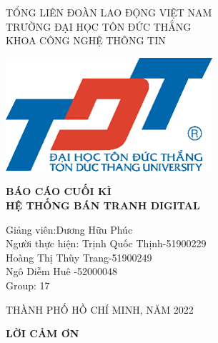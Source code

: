 \documentclass{article}
\begin{document}
	\setmainfont{Times New Roman}

	\begin{center}
		{\large 	TỔNG LIÊN ĐOÀN LAO ĐỘNG VIỆT NAM\\
			TRƯỜNG ĐẠI HỌC TÔN ĐỨC THẮNG\\
			KHOA CÔNG NGHỆ THÔNG TIN\\ }
	
	\end{center}

\begin{center}

	\includegraphics{anh1.png}
\end{center}

	\begin{center}
	\textbf	{\Large 	BÁO CÁO CUỐI KÌ\\
			HỆ THỐNG BÁN TRANH DIGITAL}

\end{center}
\vspace{3cm}

\begin{flushright}
	
	{\large Giảng viên:}{\large Dương Hữu Phúc\\ } 
	{\large Người thực hiện:} {\large Trịnh Quốc Thịnh-51900229\\
		Hoàng Thị Thùy Trang-51900249\\
		Ngô Diễm Huê -52000048\\ }
	{\large Group: 17}\
	
	
\end{flushright}
\vspace{3cm}

	\begin{center}
		{\large THÀNH PHỐ HỒ CHÍ MINH, NĂM 2022}


\end{center}
	\newpage
\begin{center}
\textbf	{ \LARGE  LỜI CẢM ƠN \\}

\end{center}
\end{document}
